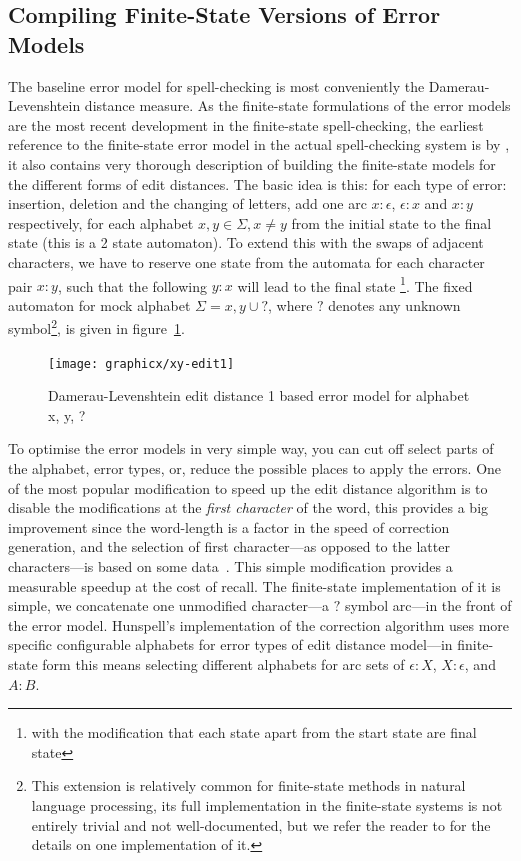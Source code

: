 \documentclass[a4paper,12pt]{article}
\begin{document}
\subsection{Compiling Finite-State Versions of Error Models}
\label{subsec:error-models}

The baseline error model for spell-checking is most conveniently the
Damerau-Levenshtein distance measure. As the finite-state formulations of the
error models are the most recent development in the finite-state
spell-checking, the earliest reference to the finite-state error model in the
actual spell-checking system is by \cite{schulz/2002}, it also contains very
thorough description of building the finite-state models for the different
forms of edit distances. The basic idea is this: for each type of error:
insertion, deletion and the changing of letters, add one arc $x:\epsilon$,
$\epsilon:x$ and $x:y$ respectively, for each alphabet $x, y \in \Sigma, x \neq
y$ from the initial state to the final state (this is a 2 state automaton). To
extend this with the swaps of adjacent characters, we have to reserve one state
from the automata for each character pair $x:y$, such that the following $y:x$
will lead to the final state \cite[]{pirinen/2010/lrec}\footnote{with the
    modification that each state apart from the start state are final state}.
    The fixed automaton for mock alphabet $\Sigma = {x, y} \cup {?}$, where $?$
    denotes any unknown symbol\footnote{This extension is relatively common for
        finite-state methods in natural language processing, its full
    implementation in the finite-state systems is not entirely trivial and not
well-documented, but we refer the reader to \cite[]{beesley2003finite} for the
details on one implementation of it.}, is given in figure~\ref{fig:xy-edit-1}.

\begin{figure}
    \centering
    \texttt{[image: graphicx/xy-edit1]}
    \caption{Damerau-Levenshtein edit distance 1 based error model for
        alphabet {x, y, ?}
    \label{fig:xy-edit-1}}
\end{figure}

To optimise the error models in very simple way, you can cut off select parts
of the alphabet, error types, or, reduce the possible places to apply the
errors.  One of the most popular modification to speed up the edit distance
algorithm is to disable the modifications at the \emph{first character} of the
word, this provides a big improvement since the word-length is a factor in the
speed of correction generation, and the selection of first character---as
opposed to the latter characters---is based on some
data~\cite[]{bhagat2007spelling}.  This simple modification provides a
measurable speedup at the cost of recall. The finite-state implementation of it
is simple, we concatenate one unmodified character---a $?$ symbol arc---in the
front of the error model.  Hunspell's implementation of the correction
algorithm uses more specific configurable alphabets for error types of edit
distance model---in finite-state form this means selecting different alphabets
for arc sets of $\epsilon:X$, $X:\epsilon$, and $A:B$.
\end{document}
